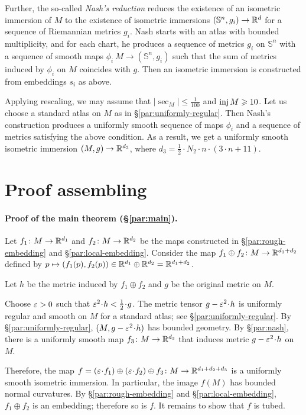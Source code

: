 \documentclass[a4paper,10pt]{article}
\begin{document}
Further, the so-called \emph{Nash's reduction} \cite[Part D]{nash} reduces the existence of an isometric immersion of $M$ to the existence of isometric immersions $(\mathbb{S}^n,g_i)\to \mathbb{R}^d$ for a sequence of Riemannian metrics $g_i$.
Nash starts with an atlas with bounded multiplicity, and for each chart, he produces a sequence of metrics $g_i$ on $\mathbb{S}^n$ with a sequence of smooth maps $\phi_i\:M\to (\mathbb{S}^n,g_i)$ 
such that the sum of metrics induced by $\phi_i$ on $M$ coincides with $g$.
Then an isometric immersion is constructed from embeddings $s_i$ as above.

Applying rescaling, we may assume that $|\sec_M|\le \tfrac1{100}$ and $\operatorname{\rm inj} M\geqslant 10$.
Let us choose a standard atlas on $M$ as in §\ref{par:uniformly-regular}.
Then Nash's construction produces a uniformly smooth sequence of maps $\phi_i$ and a sequence of metrics satisfying the above condition.
As a result, we get a uniformly smooth isometric immersion $(M,g)\to \mathbb{R}^{d_3}$, where $d_3= \tfrac12\cdot N_2\cdot n\cdot(3\cdot n+11)$.

\section*{Proof assembling}


\paragraph{Proof of the main theorem (§\ref{par:main}).}\label{par:main-proof}
Let $f_1\colon M\to\mathbb{R}^{d_1}$ and $f_2\colon M\to\mathbb{R}^{d_2}$ be the maps constructed in §\ref{par:rough-embedding} and §\ref{par:local-embedding}.
Consider the map $f_1\oplus f_2\colon M\to \mathbb{R}^{d_1+d_2}$ defined by $p\mapsto (f_1(p),f_2(p))\in \mathbb{R}^{d_1}\oplus\mathbb{R}^{d_2}=\mathbb{R}^{d_1+d_2}$.

Let $h$ be the metric induced by $f_1\oplus f_2$
and $g$ be the original metric on $M$.

Choose $\varepsilon>0$ such that $\eps^2\cdot h<\tfrac12\cdot g$.
The metric tensor $g-\eps^2\cdot h$ is uniformly regular and smooth on $M$ for a standard atlas; see §\ref{par:uniformly-regular}.
By §\ref{par:uniformly-regular}, $(M,g-\eps^2\cdot h)$ has bounded geometry.
By §\ref{par:nash}, there is a uniformly smooth map $f_3\colon M\to\mathbb{R}^{d_3}$ that induces metric $g-\eps^2\cdot h$ on $M$.

Therefore, the map $f=(\eps\cdot f_1)\oplus (\eps\cdot f_2)\oplus f_3\:M\to \RR^{d_1+d_2+d_3}$ is a uniformly smooth isometric immersion.
In particular, the image $f(M)$ has bounded normal curvatures.
By §\ref{par:rough-embedding} and §\ref{par:local-embedding}, $f_1\oplus f_2$ is an embedding;
therefore so is $f$.
It remains to show that $f$ is tubed.
\end{document}
